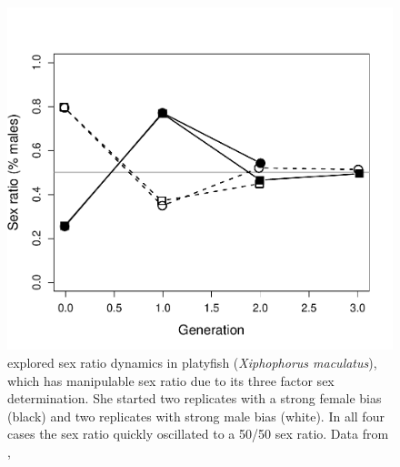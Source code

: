 {%



\begin{figure}
\begin{center}
\includegraphics[width= 0.75 \textwidth]{Journal_figs/single_locus_selection/Sex_ratio_basolo/Sex_ratio_basolo.pdf}
\end{center}
\caption{\citet{basolo1994dynamics} explored sex ratio dynamics in platyfish ({\it Xiphophorus
 maculatus}), which has manipulable sex ratio due to its three factor sex determination. She started two replicates with a strong female bias (black) and two replicates with strong male bias (white). In all four cases the sex ratio quickly oscillated to a 50/50 sex ratio.  Data from \citet{basolo1994dynamics}, } \label{fig:sex_ratio}
\end{figure}

}

